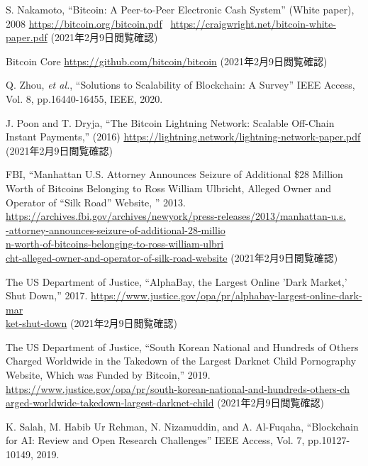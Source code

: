 \documentclass[graybox]{svmult}
\begin{document}
\begin{thebibliography}{99}

  S. Nakamoto, 
  ``Bitcoin: A Peer-to-Peer Electronic Cash System''
  (White paper), 2008 
  \url{https://bitcoin.org/bitcoin.pdf} \ 
  \url{https://craigwright.net/bitcoin-white-}\\
  \url{paper.pdf}
  (2021年2月9日閲覧確認)


  Bitcoin Core 
  \url{https://github.com/bitcoin/bitcoin}
  (2021年2月9日閲覧確認)


  Q. Zhou, \textit{et al.}, 
  ``Solutions to Scalability of Blockchain: A Survey''
  IEEE Access, Vol. 8, pp.16440-16455, IEEE, 2020. 


  J. Poon and T. Dryja, 
  ``The Bitcoin Lightning Network: Scalable Off-Chain Instant Payments,'' 
  (2016) \url{https://lightning.network/lightning-network-paper.pdf}
  (2021年2月9日閲覧確認)


  FBI, 
  ``Manhattan U.S. Attorney Announces Seizure of Additional \$28 Million 
    Worth of Bitcoins Belonging to Ross William Ulbricht, Alleged Owner 
    and Operator of ``Silk Road'' Website, '' 2013.
  \url{https://archives.fbi.gov/archives/newyork/press-releases/2013/manhattan-u.s.}\\
  \url{-attorney-announces-seizure-of-additional-28-millio}\\
  \url{n-worth-of-bitcoins-belonging-to-ross-william-ulbri}\\
  \url{cht-alleged-owner-and-operator-of-silk-road-website}
  (2021年2月9日閲覧確認)

  The US Department of Justice,
  ``AlphaBay, the Largest Online 'Dark Market,' Shut Down,'' 2017.
  \url{https://www.justice.gov/opa/pr/alphabay-largest-online-dark-mar}\\
  \url{ket-shut-down}
  (2021年2月9日閲覧確認)

  The US Department of Justice,
  ``South Korean National and Hundreds of Others Charged Worldwide in the Takedown 
    of the Largest Darknet Child Pornography Website, Which was Funded by Bitcoin,'' 
  2019.
  \url{https://www.justice.gov/opa/pr/south-korean-national-and-hundreds-others-ch}\\
  \url{arged-worldwide-takedown-largest-darknet-child}
  (2021年2月9日閲覧確認)


  K. Salah, M. Habib Ur Rehman, N. Nizamuddin, and A. Al-Fuqaha,
  ``Blockchain for AI: Review and Open Research Challenges''
  IEEE Access, Vol. 7, pp.10127-10149, 2019.



\end{thebibliography}
\end{document}
